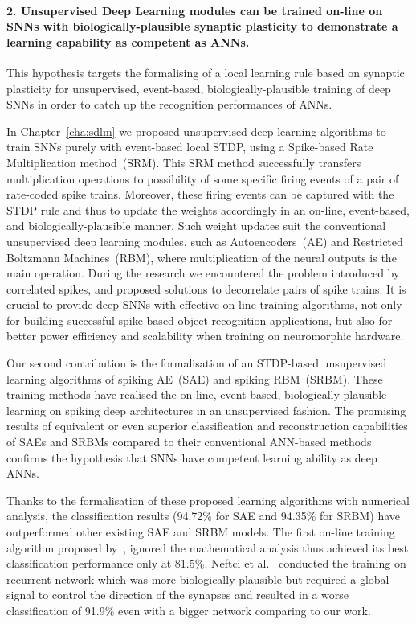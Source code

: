 \paragraph{2. Unsupervised Deep Learning modules can be trained on-line on SNNs with biologically-plausible synaptic plasticity to demonstrate a learning capability as competent as ANNs.}
This hypothesis targets the formalising of a local learning rule based on synaptic plasticity for unsupervised, event-based, biologically-plausible training of deep SNNs in order to catch up the recognition performances of ANNs.

In Chapter~\ref{cha:sdlm} we proposed unsupervised deep learning algorithms to train SNNs purely with event-based local STDP, using a Spike-based Rate Multiplication method~(SRM).
This SRM method successfully transfers multiplication operations to possibility of some specific firing events of a pair of rate-coded spike trains.
Moreover, these firing events can be captured with the STDP rule and thus to update the weights accordingly in an on-line, event-based, and biologically-plausible manner.
Such weight updates suit the conventional unsupervised deep learning modules, such as Autoencoders~(AE) and Restricted Boltzmann Machines~(RBM), where multiplication of the neural outputs is the main operation.
During the research we encountered the problem introduced by correlated spikes, and proposed solutions to decorrelate pairs of spike trains.
It is crucial to provide deep SNNs with effective on-line training algorithms, not only for building successful spike-based object recognition applications, but also for better power efficiency and scalability when training on neuromorphic hardware.

Our second contribution is the formalisation of an STDP-based unsupervised learning algorithms of spiking AE~(SAE) and spiking RBM~(SRBM).
These training methods have realised the on-line, event-based, biologically-plausible learning on spiking deep architectures in an unsupervised fashion.
The promising results of equivalent or even superior classification and reconstruction capabilities of SAEs and SRBMs compared to their conventional ANN-based methods confirms the hypothesis that SNNs have competent learning ability as deep ANNs.

Thanks to the formalisation of these proposed learning algorithms with numerical analysis, the classification results (94.72\% for SAE and 94.35\% for SRBM) have outperformed other existing SAE and SRBM models.
The first on-line training algorithm proposed by~\cite{neil2013online}, ignored the mathematical analysis thus achieved its best classification performance only at 81.5\%.
Neftci et al.~\cite{neftci2013event} conducted the training on recurrent network which was more biologically plausible but required a global signal to control the direction of the synapses and resulted in a worse classification of 91.9\% even with a bigger network comparing to our work.


